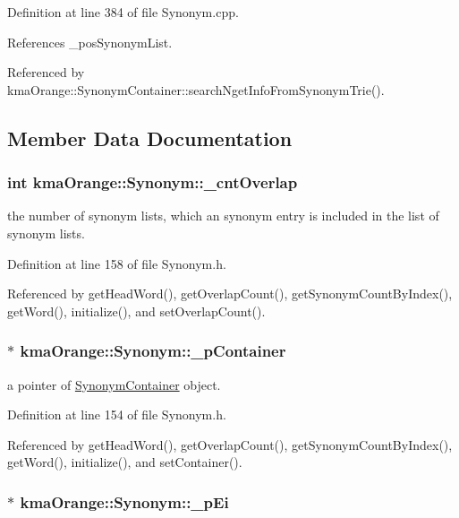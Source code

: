 Definition at line 384 of file Synonym.cpp.

References \_\-posSynonymList.

Referenced by kmaOrange::SynonymContainer::searchNgetInfoFromSynonymTrie().

\subsection{Member Data Documentation}
\hypertarget{classkmaOrange_1_1Synonym_b204328a0e9c941a61a6871d12e8b633}{
\subsubsection[{\_\-cntOverlap}]{\setlength{\rightskip}{0pt plus 5cm}int {\bf kmaOrange::Synonym::\_\-cntOverlap}}}
\label{classkmaOrange_1_1Synonym_b204328a0e9c941a61a6871d12e8b633}


the number of synonym lists, which an synonym entry is included in the list of synonym lists. 



Definition at line 158 of file Synonym.h.

Referenced by getHeadWord(), getOverlapCount(), getSynonymCountByIndex(), getWord(), initialize(), and setOverlapCount().\hypertarget{classkmaOrange_1_1Synonym_f7c63e33c3c7216502bbb8c20e347663}{
\subsubsection[{\_\-pContainer}]{$\ast$ {\bf kmaOrange::Synonym::\_\-pContainer}}}
\label{classkmaOrange_1_1Synonym_f7c63e33c3c7216502bbb8c20e347663}


a pointer of \hyperlink{classkmaOrange_1_1SynonymContainer}{SynonymContainer} object. 



Definition at line 154 of file Synonym.h.

Referenced by getHeadWord(), getOverlapCount(), getSynonymCountByIndex(), getWord(), initialize(), and setContainer().\hypertarget{classkmaOrange_1_1Synonym_1a32ce984031ad0c9e93500443b66853}{
\subsubsection[{\_\-pEi}]{$\ast$ {\bf kmaOrange::Synonym::\_\-pEi}}}
\label{classkmaOrange_1_1Synonym_1a32ce984031ad0c9e93500443b66853}


